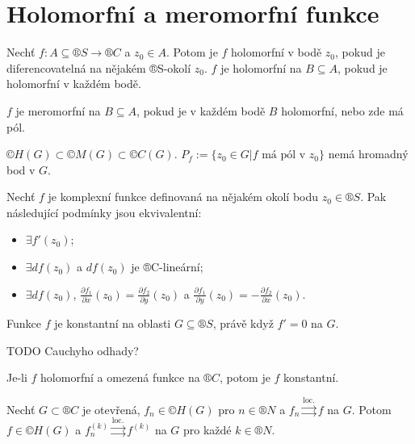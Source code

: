 \documentclass[12pt]{article}					%
\begin{document}
\section{Holomorfní a meromorfní funkce}
\begin{definice}
	Nechť $f: A \subseteq ®S \rightarrow ®C$ a $z_0 \in A$. Potom je $f$ holomorfní v bodě $z_0$, pokud je diferencovatelná na nějakém ®S-okolí $z_0$. $f$ je holomorfní na $B \subseteq A$, pokud je holomorfní v každém bodě.

	$f$ je meromorfní na $B \subseteq A$, pokud je v každém bodě $B$ holomorfní, nebo zde má pól.

	\begin{dusledekin}
		$©H(G) \subset ©M(G) \subset ©C(G)$. $P_f := \{z_0 \in G | f \text{ má pól v } z_0\}$ nemá hromadný bod v $G$.
	\end{dusledekin}
\end{definice}

\begin{tvrzeni}
	Nechť $f$ je komplexní funkce definovaná na nějakém okolí bodu $z_0 \in ®S$. Pak následující podmínky jsou ekvivalentní:
	\begin{itemize}
		\item $\exists f'(z_0)$;
		\item $\exists df(z_0)$ a $df(z_0)$ je ®C-lineární;
		\item $\exists df(z_0)$, $\frac{\partial f_1}{\partial x}(z_0) = \frac{\partial f_2}{\partial y}(z_0)$ a $\frac{\partial f_1}{\partial y}(z_0) = - \frac{\partial f_2}{\partial x}(z_0)$.
	\end{itemize}
\end{tvrzeni}

\begin{tvrzeni}
	Funkce $f$ je konstantní na oblasti $G \subseteq ®S$, právě když $f' = 0$ na $G$.
\end{tvrzeni}

TODO Cauchyho odhady?

\begin{veta}[Liouville]
	Je-li $f$ holomorfní a omezená funkce na $®C$, potom je $f$ konstantní.
\end{veta}

\begin{veta}[Weierstrass]
	Nechť $G \subset ®C$ je otevřená, $f_n \in ©H(G)$ pro $n \in ®N$ a $f_n \overset{\text{loc.}}\rightrightarrows f$ na $G$. Potom $f \in ©H(G)$ a $f_n^{(k)} \overset{\text{loc.}}\rightrightarrows f^{(k)}$ na $G$ pro každé $k \in ®N$.
\end{veta}
\end{document}
